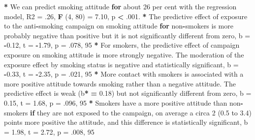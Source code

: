 \documentclass[a4paper]{book}
\newenvironment{Shaded}{\begin{snugshade}}{\end{snugshade}}
\newcommand{\KeywordTok}[1]{\textcolor[rgb]{0,0,0}{\textbf{#1}}}
\newcommand{\DecValTok}[1]{\textcolor[rgb]{0.00,0.00,0.00}{#1}}
\newcommand{\FloatTok}[1]{\textcolor[rgb]{0.00,0.00,0.00}{#1}}
\newcommand{\StringTok}[1]{\textcolor[rgb]{0.00,0.00,0.00}{#1}}
\newcommand{\ControlFlowTok}[1]{\textcolor[rgb]{0.00,0.00,0.00}{\textbf{#1}}}
\newcommand{\OperatorTok}[1]{\textcolor[rgb]{0.00,0.00,0.00}{\textbf{#1}}}
\newcommand{\ErrorTok}[1]{\textcolor[rgb]{0.00,0.00,0.00}{\textbf{#1}}}
\newcommand{\NormalTok}[1]{#1}
\theoremstyle{definition}
\theoremstyle{definition}
\theoremstyle{definition}
\theoremstyle{remark}
\begin{document}
\begin{Shaded}
\begin{Highlighting}[]
\OperatorTok{*}\StringTok{ }\NormalTok{We can predict smoking attitude }\ControlFlowTok{for}\NormalTok{ about }\DecValTok{26}\NormalTok{ per cent with the regression}
\NormalTok{model, R2 =}\StringTok{ }\NormalTok{.}\DecValTok{26}\NormalTok{, }\KeywordTok{F}\NormalTok{ (}\DecValTok{4}\NormalTok{, }\DecValTok{80}\NormalTok{) =}\StringTok{ }\FloatTok{7.10}\NormalTok{, p }\OperatorTok{<}\StringTok{ }\NormalTok{.}\DecValTok{001}\NormalTok{.}
\OperatorTok{*}\StringTok{ }\NormalTok{The predictive effect of exposure to the anti}\OperatorTok{-}\NormalTok{smoking campaign on smoking}
\NormalTok{attitude }\ControlFlowTok{for}\NormalTok{ non}\OperatorTok{-}\NormalTok{smokers is more probably negative than positive but it is not}
\NormalTok{significantly different from zero, b =}\StringTok{ }\OperatorTok{-}\FloatTok{0.12}\NormalTok{, t =}\StringTok{ }\OperatorTok{-}\FloatTok{1.79}\NormalTok{, p =}\StringTok{ }\NormalTok{.}\DecValTok{078}\NormalTok{,}
\DecValTok{95}\NormalTok{%
\OperatorTok{*}\StringTok{ }\NormalTok{For smokers, the predictive effect of campaign exposure on smoking attitude}
\NormalTok{is more strongly negative. The moderation of the exposure effect by smoking}
\NormalTok{status is negative and statistically significant, b =}\StringTok{ }\OperatorTok{-}\FloatTok{0.33}\NormalTok{, t =}\StringTok{ }\OperatorTok{-}\FloatTok{2.35}\NormalTok{, p =}
\NormalTok{.}\DecValTok{021}\NormalTok{, }\DecValTok{95}\NormalTok{%
\OperatorTok{*}\StringTok{ }\NormalTok{More contact with smokers is associated with a more positive attitude}
\NormalTok{towards smoking rather than a negative attitude. The predictive effect is weak}
\NormalTok{(b}\OperatorTok{*}\StringTok{ }\ErrorTok{=}\StringTok{ }\FloatTok{0.18}\NormalTok{) but not significantly different from zero, b =}\StringTok{ }\FloatTok{0.15}\NormalTok{, t =}\StringTok{ }\FloatTok{1.68}\NormalTok{, p =}
\NormalTok{.}\DecValTok{096}\NormalTok{, }\DecValTok{95}\NormalTok{%
\OperatorTok{*}\StringTok{ }\NormalTok{Smokers have a more positive attitude than non}\OperatorTok{-}\NormalTok{smokers }\ControlFlowTok{if}\NormalTok{ they are not}
\NormalTok{exposed to the campaign, on average a circa }\DecValTok{2}\NormalTok{ (}\FloatTok{0.5}\NormalTok{ to }\FloatTok{3.4}\NormalTok{) points more}
\NormalTok{positive the attitude, and this difference is statistically significant, }
\NormalTok{b =}\StringTok{ }\FloatTok{1.98}\NormalTok{, t =}\StringTok{ }\FloatTok{2.72}\NormalTok{, p =}\StringTok{ }\NormalTok{.}\DecValTok{008}\NormalTok{, }\DecValTok{95}\NormalTok{%
  
}}}}
\end{Highlighting}
\end{Shaded}
\end{document}

